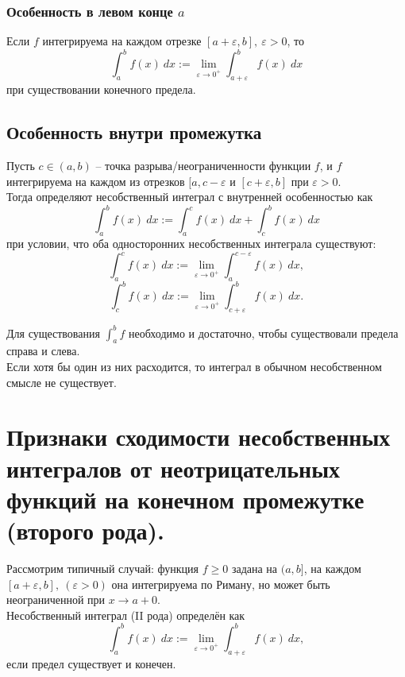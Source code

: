 \documentclass[14pt]{extreport}
\begin{document}
    \subsection{Особенность в левом конце $a$}
    Если $f$ интегрируема на каждом отрезке $[a+\varepsilon,b],\ \varepsilon>0$, то 
    \[
    \int_a^b f(x)\ dx := \lim_{\varepsilon \rightarrow 0^+} \int_{a+\varepsilon}^b f(x)\ dx
    \]
    при существовании конечного предела.

    \section{Особенность внутри промежутка}
    Пусть $c \in (a,b)$ – точка разрыва/неограниченности функции $f$, и $f$ интегрируема на каждом из отрезков $[a,c-\varepsilon$ и $[c+\varepsilon,b]$ при $\varepsilon>0$.\\
    Тогда определяют несобственный интеграл с внутренней особенностью как
    \[
    \int_a^b f(x)\ dx := \int_a^c f(x)\ dx + \int_c^b f(x)\ dx
    \]
    при условии, что оба односторонних несобственных интеграла существуют:
    \[
    \int_a^c f(x)\ dx := \lim_{\varepsilon \rightarrow 0^+} \int_a^{c-\varepsilon} f(x)\ dx,
    \]
    \[
    \int_c^b f(x)\ dx := \lim_{\varepsilon \rightarrow 0^+} \int_{c+\varepsilon}^b f(x)\ dx.
    \]

    \begin{remark}
        Для существования $\int_a^b f$ необходимо и достаточно, чтобы существовали предела справа и слева.\\
        Если хотя бы один из них расходится, то интеграл в обычном несобственном смысле не существует.
    \end{remark}



    \chapter{Признаки сходимости несобственных интегралов от неотрицательных функций на конечном промежутке (второго рода).}

    Рассмотрим типичный случай: функция $f \geq 0$ задана на $(a,b]$, на каждом $[a+\varepsilon,b],\ (\varepsilon>0)$ она интегрируема по Риману, но может быть неограниченной при $x \rightarrow a+0$.\\
    Несобственный интеграл (II рода) определён как
    \[
    \int_a^b f(x)\ dx := \lim_{\varepsilon \rightarrow 0^+} \int_{a+\varepsilon}^b f(x)\ dx,
    \]
    если предел существует и конечен.
\end{document}
